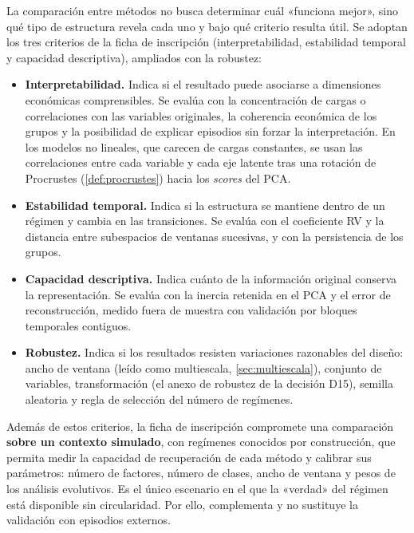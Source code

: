 La comparación entre métodos no busca determinar cuál «funciona mejor», sino qué tipo de estructura
revela cada uno y bajo qué criterio resulta útil. Se adoptan los tres criterios de la ficha de
inscripción (interpretabilidad, estabilidad temporal y capacidad descriptiva), ampliados con la
robustez:

\begin{itemize}[leftmargin=*]
  \item \textbf{Interpretabilidad.} Indica si el resultado puede asociarse a dimensiones económicas
    comprensibles. Se evalúa con la concentración de cargas o correlaciones con las variables
    originales, la coherencia económica de los grupos y la posibilidad de explicar episodios sin
    forzar la interpretación. En los modelos no lineales, que carecen de cargas constantes, se usan
    las correlaciones entre cada variable y cada eje latente tras una rotación de Procrustes
    (\cref{def:procrustes}) hacia los \emph{scores} del PCA.
  \item \textbf{Estabilidad temporal.} Indica si la estructura se mantiene dentro de un régimen y
    cambia en las transiciones. Se evalúa con el coeficiente RV y la distancia entre subespacios de
    ventanas sucesivas, y con la persistencia de los grupos.
  \item \textbf{Capacidad descriptiva.} Indica cuánto de la información original conserva la
    representación. Se evalúa con la inercia retenida en el PCA y el error de reconstrucción,
    medido fuera de muestra con validación por bloques temporales contiguos.
  \item \textbf{Robustez.} Indica si los resultados resisten variaciones razonables del diseño:
    ancho de ventana (leído como multiescala, \cref{sec:multiescala}), conjunto de variables,
    transformación (el anexo de robustez de la decisión D15), semilla aleatoria y regla de
    selección del número de regímenes.
\end{itemize}

Además de estos criterios, la ficha de inscripción compromete una comparación \textbf{sobre un
contexto simulado}, con regímenes conocidos por construcción, que permita medir la capacidad de
recuperación de cada método y calibrar sus parámetros: número de factores, número de clases, ancho
de ventana y pesos de los análisis evolutivos. Es el único escenario en el que la «verdad» del
régimen está disponible sin circularidad. Por ello, complementa y no sustituye la validación con
episodios externos.

